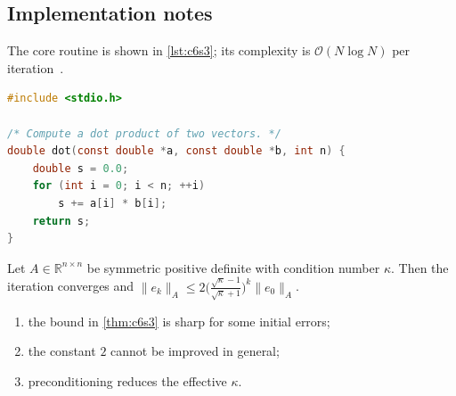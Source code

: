 \lipsum[67-68]

\subsection{Implementation notes}\label{sec:c6s3-i}
The core routine is shown in \cref{lst:c6s3}; its complexity is $\mathcal{O}(N\log N)$ per iteration~\cite{ch6-2}.

\begin{lstlisting}[language=c,caption={Reference implementation for c6s3.},label={lst:c6s3}]
#include <stdio.h>

/* Compute a dot product of two vectors. */
double dot(const double *a, const double *b, int n) {
    double s = 0.0;
    for (int i = 0; i < n; ++i)
        s += a[i] * b[i];
    return s;
}
\end{lstlisting}

\kant[7-12]
\begin{theorem}\label{thm:c6s3}
Let $A\in\mathbb{R}^{n\times n}$ be symmetric positive definite with condition number $\kappa$. Then the iteration converges and
$\lVert e_k\rVert_A \le 2\bigl(\tfrac{\sqrt\kappa-1}{\sqrt\kappa+1}\bigr)^k\lVert e_0\rVert_A$.
\end{theorem}
\begin{enumerate}[label=(\roman*)]
\item the bound in \cref{thm:c6s3} is sharp for some initial errors;
\item the constant $2$ cannot be improved in general;
\item preconditioning reduces the effective $\kappa$.
\end{enumerate}

\lipsum[121-121]
